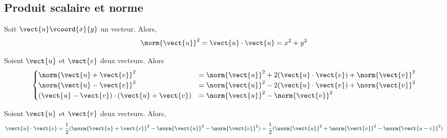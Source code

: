 \documentclass{article}
\begin{document}
\subsection{Produit scalaire et norme}
\begin{proposition}
Soit $\vect{u}\vcoord{x}{y}$ un vecteur. Alors,
\begin{equation*}
\norm{\vect{u}}^2 = \vect{u} \cdot \vect{u} = x^2 + y^2
\end{equation*}
\end{proposition}
\begin{proposition}
Soient $\vect{u}$ et $\vect{v}$ deux vecteurs. Alors
\begin{equation*}
\begin{cases}
\norm{\vect{u} + \vect{v}}^2 &= \norm{\vect{u}}^2 + 2(\vect{u} \cdot \vect{v})+ \norm{\vect{v}}^2\\
\norm{\vect{u} - \vect{v}}^2 &= \norm{\vect{u}}^2 - 2(\vect{u} \cdot \vect{v})+ \norm{\vect{v}}^2\\
(\vect{u} - \vect{v}) \cdot (\vect{u} + \vect{v}) &= \norm{\vect{u}}^2 - \norm{\vect{v}}^2
\end{cases}
\end{equation*}
\end{proposition}
\begin{tcolorbox}
\begin{proposition}
Soient $\vect{u}$ et $\vect{v}$ deux vecteurs. Alors,
\begin{equation*}
\vect{u} \cdot \vect{v} = \dfrac{1}{2}(\norm{\vect{u} + \vect{v}}^2 - \norm{\vect{u}}^2 - \norm{\vect{v}}^2) = \dfrac{1}{2}(\norm{\vect{u}}^2 + \norm{\vect{v}}^2 - \norm{\vect{u - v}}^2)
\end{equation*}
\end{proposition}
\end{tcolorbox}
\end{document}
